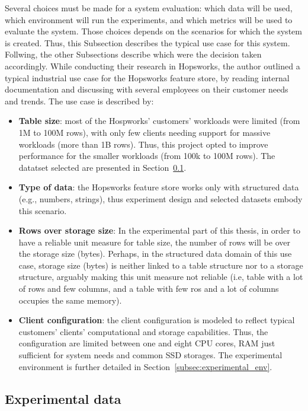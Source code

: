Several choices must be made for a system evaluation: which data will be used, which environment will run the experiments, and which metrics will be used to evaluate the system. Those choices depends on the scenarios for which the system is created. Thus, this Subsection describes the typical use case for this system. Follwing, the other Subsections describe which were the decision taken accordingly. While conducting their research in Hopsworks, the author outlined a typical industrial use case for the Hopsworks feature store, by reading internal documentation and discussing with several employees on their customer needs and trends. The use case is described by:
\begin{itemize}  
  \item \textbf{Table size}: most of the Hospworks' customers' workloads were limited (from 1M to 100M rows), with only few clients needing support for massive workloads (more than 1B rows). Thus, this project opted to improve performance for the smaller workloads (from 100k to 100M rows). The datatset selected are presented in Section~\ref{subsec:experimental_data}.
  \item \textbf{Type of data}: the Hopsworks feature store works only with structured data (e.g., numbers, strings), thus experiment design and selected datasets embody this scenario.
  \item \textbf{Rows over storage size}: In the experimental part of this thesis, in order to have a reliable unit measure for table size, the number of rows will be over the storage size (bytes). Perhaps, in the structured data domain of this use case, storage size (bytes) is neither linked to a table structure nor to a storage structure, arguably making this unit measure not reliable (i.e, table with a lot of rows and few columns, and a table with few ros and a lot of columns occupies the same memory).
  \item \textbf{Client configuration}: the client configuration is modeled to reflect typical customers' clients' computational and storage capabilities. Thus, the configuration are limited between one and eight \gls{CPU} cores, \gls{RAM} just sufficient for system needs and common \gls{SSD} storages. The experimental environment is further detailed in Section~\ref{subsec:experimental_env}.
\end{itemize}



\subsection{Experimental data}
\label{subsec:experimental_data}

